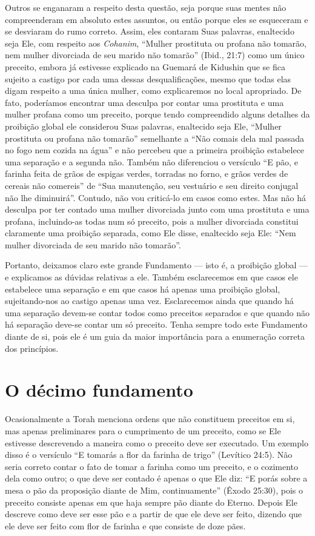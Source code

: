 Outros se enganaram a respeito desta questão, seja porque suas mentes
não compreenderam em absoluto estes assuntos, ou então porque eles se
esqueceram e se desviaram do rumo correto. Assim, eles contaram Suas
palavras, enaltecido seja Ele, com respeito aos \textit{Cohanim}, ``Mulher
prostituta ou profana não tomarão, nem mulher divorciada de seu marido
não tomarão'' (Ibid., 21:7) como um único preceito, embora já estivesse
explicado na Guemará de Kidushin que se fica sujeito a castigo por cada
uma dessas desqualificações, mesmo que todas elas digam respeito a uma
única mulher, como explicaremos no local apropriado. De fato, poderíamos
encontrar uma desculpa por contar uma
prostituta e uma mulher profana como um preceito, porque tendo
compreendido alguns detalhes da proibição global ele considerou Suas
palavras, enaltecido seja Ele, ``Mulher prostituta ou profana não
tomarão'' semelhante a ``Não comais dela mal passada no fogo nem cozida
na água'' e não percebeu que a primeira proibição estabelece uma
separação e a segunda não. Também não diferenciou o versículo ``E pão,
e farinha feita de grãos de espigas verdes, torradas no forno, e grãos
verdes de cereais não comereis'' de ``Sua manutenção, seu vestuário e
seu direito conjugal não lhe diminuirá''. Contudo, não vou criticá-lo
em casos como estes. Mas não há desculpa por ter contado uma mulher
divorciada junto com uma prostituta e uma profana, incluindo-as todas
num só preceito, pois a mulher divorciada constitui claramente uma
proibição separada, como Ele disse, enaltecido seja Ele: ``Nem mulher
divorciada de seu marido não tomarão''.

Portanto, deixamos claro este grande Fundamento --- isto é, a proibição
global --- e explicamos as dúvidas relativas a ele. Também esclarecemos
em que casos ele estabelece uma separação e em que casos há apenas uma
proibição global, sujeitando-nos ao castigo apenas uma vez.
Esclarecemos ainda que quando há uma separação devem-se contar todos
como preceitos separados e que quando não há separação deve-se contar um
só preceito. Tenha sempre todo este Fundamento diante de si, pois ele é
um guia da maior importância para a enumeração correta dos princípios.

\chapter*{O décimo fundamento}

Ocasionalmente a Torah menciona ordens que não constituem preceitos em
si, mas apenas preliminares para o cumprimento de um preceito, como se
Ele estivesse descrevendo a maneira como o preceito deve ser executado.
Um exemplo disso é o versículo ``E tomarás a flor da farinha de trigo''
(Levítico 24:5). Não seria correto contar o fato de tomar a farinha
como um preceito, e o cozimento dela como outro; o que deve ser contado
é apenas o que Ele diz: ``E porás sobre a mesa o pão da proposição
diante de Mim, continuamente'' (Êxodo 25:30), pois o preceito consiste
apenas em que haja sempre pão diante do Eterno. Depois Ele descreve como
deve ser esse pão e a partir de que ele deve ser feito, dizendo que ele
deve ser feito com flor de farinha e que consiste de doze pães.

